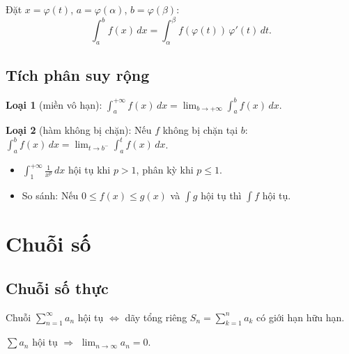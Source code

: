 \documentclass[12pt,a4paper]{article}
\begin{document}
\begin{dinhly}[title={Đổi biến trong tích phân xác định}]
  Đặt $x = \varphi(t)$, $a = \varphi(\alpha)$, $b = \varphi(\beta)$:
  \[
    \int_a^b f(x)\,dx = \int_\alpha^\beta f(\varphi(t))\,\varphi'(t)\,dt.
  \]
\end{dinhly}

\subsection{Tích phân suy rộng}

\begin{dinhnghia}
  \textbf{Loại 1} (miền vô hạn): $\displaystyle\int_a^{+\infty} f(x)\,dx = \lim_{b \to +\infty} \int_a^b f(x)\,dx$.
\end{dinhnghia}

\begin{dinhnghia}
  \textbf{Loại 2} (hàm không bị chặn): Nếu $f$ không bị chặn tại $b$: $\displaystyle\int_a^b f(x)\,dx = \lim_{t \to b^-} \int_a^t f(x)\,dx$.
\end{dinhnghia}

\begin{dinhly}[title={Tiêu chuẩn hội tụ}]
  \begin{itemize}
    \item $\displaystyle\int_1^{+\infty} \frac{1}{x^p}\,dx$ hội tụ khi $p > 1$, phân kỳ khi $p \le 1$.
    \item So sánh: Nếu $0 \le f(x) \le g(x)$ và $\int g$ hội tụ thì $\int f$ hội tụ.
  \end{itemize}
\end{dinhly}

\section{Chuỗi số}

\subsection{Chuỗi số thực}

\begin{dinhnghia}
  Chuỗi $\displaystyle\sum_{n=1}^{\infty} a_n$ hội tụ $\Leftrightarrow$ dãy tổng riêng $S_n = \sum_{k=1}^n a_k$ có giới hạn hữu hạn.
\end{dinhnghia}

\begin{dinhly}[title={Điều kiện cần}]
  $\sum a_n$ hội tụ $\Rightarrow$ $\lim_{n \to \infty} a_n = 0$.
\end{dinhly}
\end{document}
